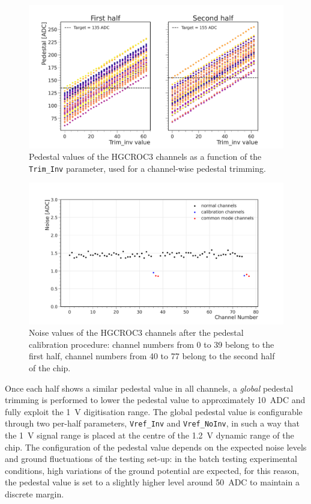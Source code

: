 \begin{figure} 
    \centering
    \includegraphics[width=0.7\linewidth]{Figures/HGCAL/Pedestal_Scan.pdf}
    \caption{Pedestal values of the HGCROC3 channels as a function of the \texttt{Trim\_Inv} parameter, used for a channel-wise pedestal trimming.}
    \label{fig:PedestalScan}
\end{figure}

\begin{figure}
    \centering
    \includegraphics[width=0.55\linewidth]{Figures/HGCAL/Noise_After.pdf}
    \caption{Noise values of the HGCROC3 channels after the pedestal calibration procedure: channel numbers from 0 to 39 belong to the first half, channel numbers from 40 to 77 belong to the second half of the chip.}
    \label{fig:Noise}
\end{figure}

Once each half shows a similar pedestal value in all channels, a \textit{global} pedestal trimming is performed to lower the pedestal value to approximately 10~ADC and fully exploit the 1~V digitisation range.
The global pedestal value is configurable through two per-half parameters, \texttt{Vref\_Inv} and \texttt{Vref\_NoInv}, in such a way that the 1~V signal range is placed at the centre of the 1.2~V dynamic range of the chip.
The configuration of the pedestal value depends on the expected noise levels and ground fluctuations of the testing set-up: in the batch testing experimental conditions, high variations of the ground potential are expected, for this reason, the pedestal value is set to a slightly higher level around 50~ADC to maintain a discrete margin.

